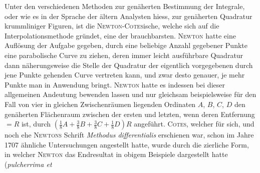 Unter den verschiedenen Methoden zur genäherten Bestimmung der Integrale, oder wie es in der Sprache der ältern Analysten hiess, zur genäherten Quadratur krummliniger Figuren, ist die \textsc{Newton}-\textsc{Cotes}ische, welche sich auf die Interpolationsmethode gründet, eine der brauchbarsten. \textsc{Newton} hatte eine Auflösung der Aufgabe gegeben, durch eine beliebige Anzahl gegebener Punkte eine parabolische Curve zu ziehen, deren immer leicht ausführbare Quadratur dann näherungsweise die Stelle der Quadratur der eigentlich vorgegebenen durch jene Punkte gehenden Curve vertreten kann, und zwar desto genauer, je mehr Punkte man in Anwendung bringt. \textsc{Newton} hatte es indessen bei dieser allgemeinen Andeutung bewenden lassen und nur gleichsam beispielsweise für den Fall von vier in gleichen Zwischenräumen liegenden Ordinaten $A$, $B$, $C$, $D$ den genäherten Flächenraum zwischen der ersten und letzten, wenn deren Entfernung $=R$ ist, durch $(\frac{1}{8}A+\frac{3}{8}B+\frac{3}{8}C+\frac{1}{8}D)R$ angeführt. \textsc{Cotes}, welcher für sich, und noch ehe \textsc{Newtons} Schrift \textit{Methodus differentialis} erschienen war, schon im Jahre 1707 ähnliche Untersuchungen angestellt hatte, wurde durch die zierliche Form, in welcher \textsc{Newton} das Endresultat in obigem Beispiele dargestellt hatte (\textit{pulcherrima et}
